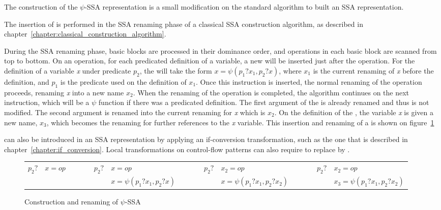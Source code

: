 
The construction of the $\psi$-SSA representation is a small
modification on the standard algorithm to built an SSA representation.

The insertion of \psifuns is performed in the SSA renaming
phase of a classical SSA construction algorithm, as described in
chapter~\ref{chapter:classical_construction_algorithm}.

During the SSA renaming phase, basic blocks are processed in their
dominance order, and operations in each basic block are scanned from
top to bottom. On an operation, for each predicated definition of a
variable, a new \psifun will be inserted just after the
operation. For the definition of a variable \textit{x} under predicate
${p_2}$, the \psifun will take the form ${x = \psi(p_1?x_1,
  p_2?x)}$, where ${x_1}$ is the current renaming of \textit{x} before
the definition, and ${p_1}$ is the predicate used on the definition of
${x_1}$. Once this instruction is inserted, the normal renaming of
the operation proceeds, renaming \textit{x} into a new name ${x_2}$.
When the renaming of the operation is completed, the
algorithm continues on the next instruction, which will be a $\psi$
function if there was a predicated definition. The first argument of
the \psifun is already renamed and thus is not modified. The
second argument is renamed into the current renaming for \textit{x}
which is ${x_2}$. On the definition of the \psifun, the
variable \textit{x} is given a new name, ${x_3}$, which becomes the
renaming for further references to the \textit{x} variable. This
insertion and renaming of a \psifun is shown on
figure~\ref{fig:psi_ssa_construct}

\psifuns can also be introduced in an SSA representation by
applying an if-conversion transformation, such as the one that is
described in chapter~\ref{chapter:if_conversion}. Local transformations
on control-flow patterns can also require to replace \phifuns
by \psifuns.

\begin{figure}
\begin{center}
\footnotesize
\begin{tabular}{lllllllllll}
${p_2?}$ & ${x = op}$ & \ \ \ \  & ${p_2?}$ & ${x = op}$                  & \ \ \ \  & ${p_2?}$ & ${x_2 = op}$               & \ \ \ \  & ${p_2?}$ & ${x_2 = op}$ \\
             &                &          &              & ${x = \psi(p_1?x_1, p_2?x)}$ &           &           & ${x = \psi(p_1?x_1, p_2?x_2)}$ &          &           & ${x_3 = \psi(p_1?x_1, p_2?x_2)}$ \\
\end{tabular}
\caption{Construction and renaming of $\psi$-SSA}
\label{fig:psi_ssa_construct}
\end{center}
\end{figure}


